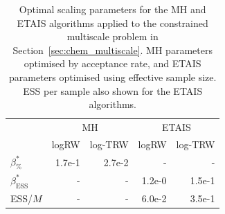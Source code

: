 \documentclass[final]{siamltex}
\newcommand{\edit}[1]{{\color{red} #1}}
\begin{document}
\edit{
\begin{table}[!h]
	\centering
	\begin{tabular}{lrrrr}
	\toprule
		 & \multicolumn{2}{c}{MH} & \multicolumn{2}{c}{ETAIS} \\ \cmidrule(lr){2-3} \cmidrule(lr){4-5}
		& logRW & log-TRW & logRW & log-TRW \\ \midrule
		$\beta_{\%}^*$	 	& 1.7e-1 &2.7e-2 & - & - \\
		$\beta_{\text{ESS}}^*$	       & -            & -          & 1.2e-0 & 1.5e-1 \\
		ESS/$M$		 	 & -            & -            & 6.0e-2 & 3.5e-1  \\
	\bottomrule
	\end{tabular}
	\caption{Optimal scaling parameters for the MH and ETAIS
          algorithms applied to the constrained multiscale problem in
          Section~\ref{sec:chem_multiscale}. MH parameters optimised
          by acceptance rate, and ETAIS parameters optimised using
          effective sample size. ESS per sample also shown for the
          ETAIS algorithms.}
\label{tab:chem_multiscale_scaling}
\end{table}}


\end{document}
